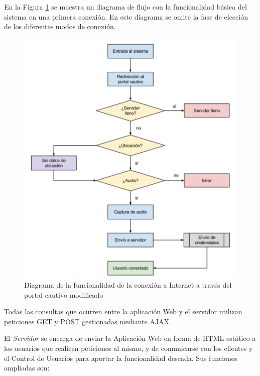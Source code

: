 En la Figura \ref{flujoSistema} se muestra un diagrama de flujo con la funcionalidad básica del sistema en una primera conexión. En este diagrama se omite la fase de elección de los diferentes modos de conexión.

\begin{figure}[!t]
\begin{center}
\includegraphics[width=0.75\linewidth]{./4_AnalisisFuncional/Img/flujoSistema.png}
\end{center}
\caption{Diagrama de la funcionalidad de la conexión a Internet a través del portal cautivo modificado}
\label{flujoSistema}
\end{figure}

Todas las consultas que ocurren entre la aplicación Web y el servidor utilizan peticiones GET y POST gestionadas mediante AJAX.

El \emph{Servidor} se encarga de enviar la Aplicación Web en forma de HTML estático a los usuarios que realicen peticiones al mismo, y de comunicarse con los clientes y el Control de Usuarios para aportar la funcionalidad deseada. Sus funciones ampliadas son:

